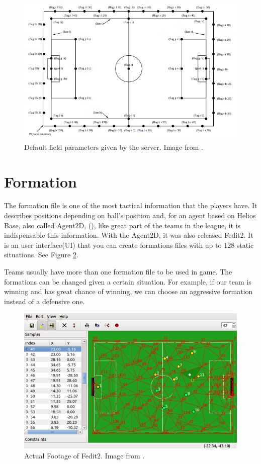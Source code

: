 \begin{figure}[H]
    \centering
    \includegraphics[scale=0.5]{images/field_params.png}
    \caption{Default field parameters given by the server. Image from \cite{ss2dmanual}.}
    \label{fig:fieldparams}
\end{figure}

\section{Formation}\label{section:formation}
The formation file is one of the most tactical information that the players have. It describes positions depending on ball's position and, for an agent based on Helios Base, also called Agent2D, (\cite{heliosbase}), like great part of the teams in the league, it is indispensable this information. With the Agent2D, it was also released Fedit2. It is an user interface(UI) that you can create formations files with up to 128 static situations. See Figure \ref{fig:fedit2}.

Teams usually have more than one formation file to be used in game. The formations can be changed given a certain situation. For example, if our team is winning and has great chance of winning, we can choose an aggressive formation instead of a defensive one.

\begin{figure}[H]
    \centering
    \includegraphics[scale=0.4]{images/fedit2.png}
    \caption{Actual Footage of Fedit2. Image from \cite{heliosbase}.}
    \label{fig:fedit2}
\end{figure}

